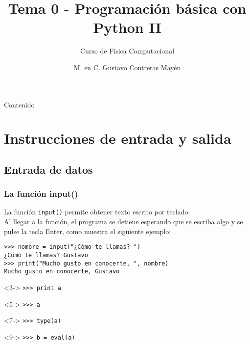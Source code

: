 \documentclass[12pt]{beamer}
\title{Tema 0 - Programaci\'{o}n b\'{a}sica con Python II}
\subtitle{Curso de F\'{i}sica Computacional}
\author[]{M. en C. Gustavo Contreras May\'{e}n}
\date{}
\begin{document}
\maketitle
\fontsize{12}{12}\selectfont
{}
\begin{frame}{Contenido}
\tableofcontents[pausesections]
\end{frame}
\section{Instrucciones de entrada y salida}
\subsection{Entrada de datos}
\begin{frame}[fragile]
\frametitle{La función input()}
La función \texttt{input()} permite obtener texto escrito por teclado.
\\
\bigskip
Al llegar a la función, el programa se detiene esperando que se escriba algo y se pulse la tecla Enter, como muestra el siguiente ejemplo:
\begin{exampleblock}{}
	\verb|>>> nombre = input("¿Cómo te llamas? ")| \\
	\verb|¿Cómo te llamas? Gustavo| \\
	\verb|>>> print("Mucho gusto en conocerte, ", nombre)| \\
	\verb|Mucho gusto en conocerte, Gustavo|
\end{exampleblock}
\begin{exampleblock}{}<3->
	\verb|>>> print a| \\
	\visible<4->{\textcolor{blue}{2}}
\end{exampleblock}
\begin{exampleblock}{}<5->
	\verb|>>> a| \\
	\visible<6->{\textcolor{blue}{'a'}}
\end{exampleblock}
\begin{exampleblock}{}<7->
	\verb|>>> type(a)| \\
	\visible<-8>{\textcolor{blue}{\texttt{<type 'str'>}}}
\end{exampleblock}

\hspace{0.5cm}
\begin{minipage}{6.5cm}
\begin{exampleblock}{}<9->
	\verb|>>> b = eval(a)|
\end{exampleblock}
\end{minipage}
\end{frame}
\end{document}
